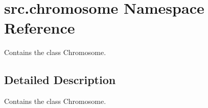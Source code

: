 \hypertarget{namespacesrc_1_1chromosome}{}\section{src.\+chromosome Namespace Reference}
\label{namespacesrc_1_1chromosome}


Contains the class Chromosome.  




\subsection{Detailed Description}
Contains the class Chromosome. 

